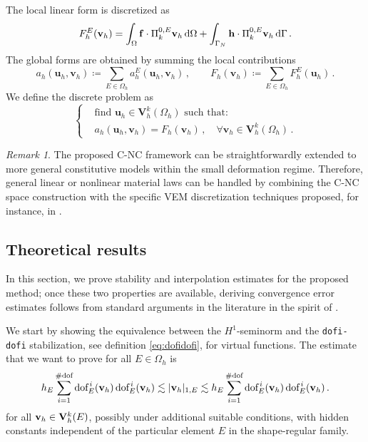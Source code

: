 \documentclass[a4paper,11pt]{article}
\theoremstyle{remark}
\newtheorem{remark}[theorem]{Remark}
\theoremstyle{definition}
\newcommand{\PiZeroE}{\Pi^{0,E}_k}
\begin{document}
The local linear form is discretized as
\begin{equation}\label{eq:FhE}
F_h^E(\mathbf{v}_h) = \int_{\Omega} \mathbf{f} \cdot \PiZeroE\mathbf{v}_h \, {\rm d} \Omega + \int_{\Gamma_N} \mathbf{h} \cdot \PiZeroE\mathbf{v}_h \, {\rm d} \Gamma \, .
\end{equation}
The global forms are obtained by summing the local contributions
\[
a_h(\mathbf{u}_h, \mathbf{v}_h)
\coloneqq \sum_{E \in \Omega_h}
a_h^E(\mathbf{u}_h, \mathbf{v}_h) \, ,
\qquad
F_h(\mathbf{v}_h)
\coloneqq \sum_{E \in \Omega_h}
F_h^E(\mathbf{u}_h) \, .
\]
We define the discrete problem as
\begin{equation}\label{eq:prob-disc}
\left\{
\begin{aligned}
&\text{find $\mathbf{u}_h \in \mathbf{V}^k_h(\Omega_h)$ such that:} \\
&a_h(\mathbf{u}_h, \mathbf{v}_h) = F_h(\mathbf{v}_h)\, , \quad \forall \mathbf{v}_h  \in \mathbf{V}^k_h(\Omega_h) \, .
\end{aligned}
\right.
\end{equation}

\begin{remark}
The proposed C-NC framework can be straightforwardly extended to more general constitutive models within the small deformation regime.
Therefore, general linear or nonlinear material laws can be handled by combining the C-NC space construction with the specific VEM discretization techniques proposed, for instance, in \cite{BLM2015}.
\end{remark}

\subsection{Theoretical results}

In this section, we prove stability and interpolation estimates for the proposed method; once these two properties are available, deriving convergence error estimates follows from standard arguments in the literature in the spirit of \cite{BeiraodaVeiga-Brezzi-Marini:2013}.

We start by showing the equivalence between the $H^1$-seminorm and the \texttt{dofi-dofi} stabilization, see definition \eqref{eq:dofidofi}, for virtual functions. The estimate that we want to prove for all $E \in \Omega_h$ is 
$$
h_E \sum_{i=1}^{\#\text{dof}} \text{dof}^{\,i}_E( {\bf v}_h) \, \text{dof}^{\,i}_E( {\bf v}_h)
\lesssim
| {\bf v}_h |_{1,E}
\lesssim
h_E \sum_{i=1}^{\#\text{dof}} \text{dof}^{\,i}_E( {\bf v}_h) \, \text{dof}^{\,i}_E( {\bf v}_h) \, .
$$
for all ${\bf v}_h \in {\bf V}^k_h(E)$, possibly under additional suitable conditions, with hidden constants independent of the particular element $E$ in the shape-regular family.
\end{document}
